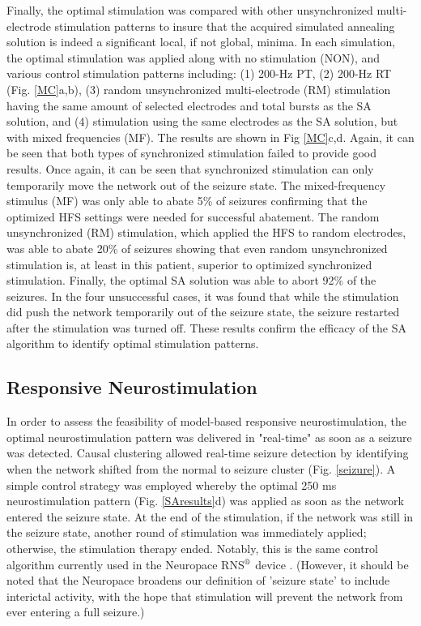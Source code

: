 \documentclass[journal,twoside,web]{ieeecolor}
\newcommand{\len}{250}   %
\newcommand{\success}{92} %
\begin{document}
Finally, the optimal stimulation was compared with other unsynchronized multi-electrode stimulation patterns to insure that the acquired simulated annealing solution is indeed a significant local, if not global, minima.
In each simulation, the optimal stimulation was applied along with no stimulation (NON), and various control stimulation patterns including:
(1) 200-Hz PT,
(2) 200-Hz RT (Fig. \ref{MC}a,b),
(3) random unsynchronized multi-electrode (RM) stimulation having the same amount of selected electrodes and total bursts as the SA solution, and
(4) stimulation using the same electrodes as the SA solution, but with mixed frequencies (MF).
The results are shown in Fig \ref{MC}c,d.
Again, it can be seen that both types of synchronized stimulation failed to provide good results.
Once again, it can be seen that synchronized stimulation can only  temporarily move the network out of the seizure state.
The mixed-frequency stimulus (MF) was only able to abate 5\% of seizures confirming that the optimized HFS settings were needed for successful abatement.
The random unsynchronized (RM) stimulation, which applied the HFS to random electrodes, was able to abate 20\% of seizures showing that even random unsynchronized stimulation is, at least in this patient, superior to optimized synchronized stimulation.
Finally, the optimal SA solution was able to abort \success{}\% of the seizures.
In the four unsuccessful cases, it was found that while the stimulation did push the network temporarily out of the seizure state, the seizure restarted after the stimulation was turned off. 
These results confirm the efficacy of the SA algorithm to identify optimal stimulation patterns.
    
    \subsection{Responsive Neurostimulation}

In order to assess the feasibility of model-based responsive neurostimulation, the optimal neurostimulation pattern was delivered in "real-time" as soon as a seizure was detected.
Causal clustering allowed real-time seizure detection by identifying when the network shifted from the normal to seizure cluster (Fig. \ref{seizure}).
A simple control strategy was employed whereby the optimal \len{} ms neurostimulation pattern (Fig. \ref{SAresults}d) was applied as soon as the network entered the seizure state.
At the end of the stimulation, if the network was still in the seizure state, another round of stimulation was immediately applied; otherwise, the stimulation therapy ended.
Notably, this is the same control algorithm currently used in the Neuropace RNS$\textsuperscript{\textregistered}$ device \cite{NP}.
(However, it should be noted that the Neuropace broadens our definition of 'seizure state' to include interictal activity, with the hope that stimulation will prevent the network from ever entering a full seizure.)
\end{document}
